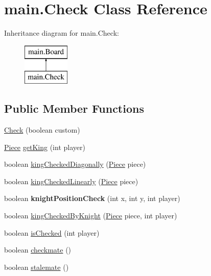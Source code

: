 \hypertarget{classmain_1_1_check}{}\section{main.\+Check Class Reference}
\label{classmain_1_1_check}
Inheritance diagram for main.\+Check\+:\begin{figure}[H]
\begin{center}
\leavevmode
\includegraphics[height=2.000000cm]{classmain_1_1_check}
\end{center}
\end{figure}
\subsection*{Public Member Functions}
\begin{DoxyCompactItemize}
\item 
\hyperlink{classmain_1_1_check_ad50f8884f3ccd0b8dfd3b5f55f3ba08b}{Check} (boolean custom)
\item 
\hyperlink{classmain_1_1_piece}{Piece} \hyperlink{classmain_1_1_check_a4c11e37a69b51afe8318b6cd99bfbe19}{get\+King} (int player)
\item 
boolean \hyperlink{classmain_1_1_check_af22afdde9a99d951237d65b8a9d32535}{king\+Checked\+Diagonally} (\hyperlink{classmain_1_1_piece}{Piece} piece)
\item 
boolean \hyperlink{classmain_1_1_check_a5230cdb389e62d0afbff4b05af28aff0}{king\+Checked\+Linearly} (\hyperlink{classmain_1_1_piece}{Piece} piece)
\item 
\mbox{\label{classmain_1_1_check_a38b5ebac39f0fcf08f1ade84fad2655c}} 
boolean {\bfseries knight\+Position\+Check} (int x, int y, int player)
\item 
boolean \hyperlink{classmain_1_1_check_ad437a473d382218735067a8ba65dddc4}{king\+Checked\+By\+Knight} (\hyperlink{classmain_1_1_piece}{Piece} piece, int player)
\item 
boolean \hyperlink{classmain_1_1_check_abb80139bcdc002c32dd5e721c490d800}{is\+Checked} (int player)
\item 
boolean \hyperlink{classmain_1_1_check_a6a22c24f1a038324813439e17bc92390}{checkmate} ()
\item 
boolean \hyperlink{classmain_1_1_check_ac4c3ae82761a5bf3649785f8e97f29ce}{stalemate} ()
\end{DoxyCompactItemize}


